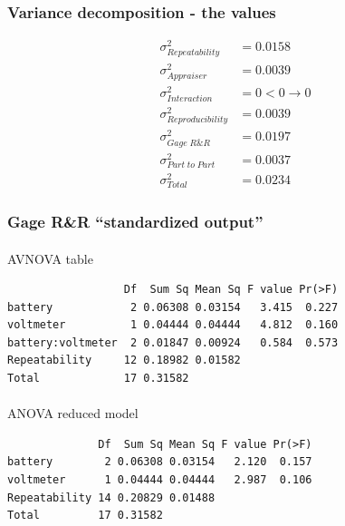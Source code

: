 \documentclass[
  a4paper,
]{scrbook}
\makeatletter
\let\oldparagraph\paragraph
\renewcommand{\paragraph}{
    \@ifstar
      \xxxParagraphStar
      \xxxParagraphNoStar
  }
\newcommand{\xxxParagraphStar}[1]{\oldparagraph*{#1}\mbox{}}
\newcommand{\xxxParagraphNoStar}[1]{\oldparagraph{#1}\mbox{}}
\makeatother
\begin{document}
\subsubsection{Variance decomposition - the
values}\label{variance-decomposition---the-values}

\begin{align}
\sigma^2_{Repeatability} &= 0.0158 \nonumber \\
\sigma^2_{Appraiser} &= 0.0039 \nonumber \\
\sigma^2_{Interaction} &= 0 <0 \rightarrow 0 \nonumber \\
\sigma^2_{Reproducibility} &= 0.0039 \nonumber \\
\sigma^2_{Gage\;R\&R} &= 0.0197 \nonumber \\
\sigma^2_{Part\; to \; Part} &= 0.0037 \nonumber \\
\sigma^2_{Total} &= 0.0234 \nonumber
\end{align}

\subsubsection{Gage R\&R ``standardized
output''}\label{gage-rr-standardized-output}

\paragraph{AVNOVA table}\label{avnova-table}

\begin{verbatim}
                  Df  Sum Sq Mean Sq F value Pr(>F)
battery            2 0.06308 0.03154   3.415  0.227
voltmeter          1 0.04444 0.04444   4.812  0.160
battery:voltmeter  2 0.01847 0.00924   0.584  0.573
Repeatability     12 0.18982 0.01582               
Total             17 0.31582                       
\end{verbatim}

\paragraph{ANOVA reduced model}\label{anova-reduced-model}

\begin{verbatim}
              Df  Sum Sq Mean Sq F value Pr(>F)
battery        2 0.06308 0.03154   2.120  0.157
voltmeter      1 0.04444 0.04444   2.987  0.106
Repeatability 14 0.20829 0.01488               
Total         17 0.31582                       
\end{verbatim}
\end{document}
